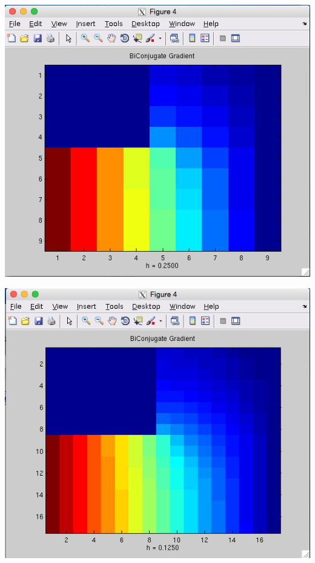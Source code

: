 \documentclass[11pt, oneside]{article}   	%
\begin{document}
\centerline{\includegraphics[scale = 0.55]{Biconjugate_h2.png}}

\centerline{\includegraphics[scale = 0.55]{Biconjugate_h3.png}}
\end{document}
